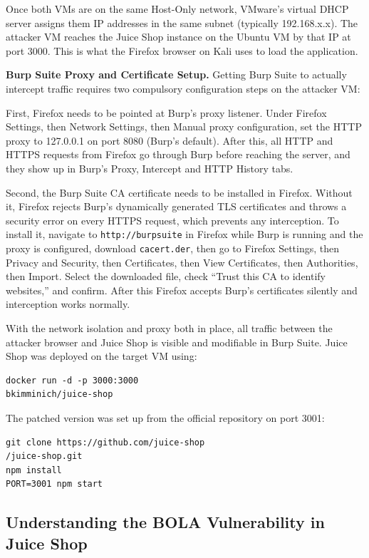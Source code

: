 \documentclass[12pt]{IEEEtran}
\begin{document}
Once both VMs are on the same Host-Only network, VMware's virtual DHCP server assigns them IP addresses in the same subnet (typically 192.168.x.x). The attacker VM reaches the Juice Shop instance on the Ubuntu VM by that IP at port 3000. This is what the Firefox browser on Kali uses to load the application.

\textbf{Burp Suite Proxy and Certificate Setup.} Getting Burp Suite to actually intercept traffic requires two compulsory configuration steps on the attacker VM:

First, Firefox needs to be pointed at Burp's proxy listener. Under Firefox Settings, then Network Settings, then Manual proxy configuration, set the HTTP proxy to 127.0.0.1 on port 8080 (Burp's default). After this, all HTTP and HTTPS requests from Firefox go through Burp before reaching the server, and they show up in Burp's Proxy, Intercept and HTTP History tabs.

Second, the Burp Suite CA certificate needs to be installed in Firefox. Without it, Firefox rejects Burp's dynamically generated TLS certificates and throws a security error on every HTTPS request, which prevents any interception. To install it, navigate to \texttt{http://burpsuite} in Firefox while Burp is running and the proxy is configured, download \texttt{cacert.der}, then go to Firefox Settings, then Privacy and Security, then Certificates, then View Certificates, then Authorities, then Import. Select the downloaded file, check ``Trust this CA to identify websites,'' and confirm. After this Firefox accepts Burp's certificates silently and interception works normally.

With the network isolation and proxy both in place, all traffic between the attacker browser and Juice Shop is visible and modifiable in Burp Suite. Juice Shop was deployed on the target VM using:

\begin{verbatim}
docker run -d -p 3000:3000 
bkimminich/juice-shop
\end{verbatim}

The patched version was set up from the official repository on port 3001:

\begin{verbatim}
git clone https://github.com/juice-shop
/juice-shop.git
npm install
PORT=3001 npm start
\end{verbatim}

\subsection{Understanding the BOLA Vulnerability in Juice Shop}
\end{document}
